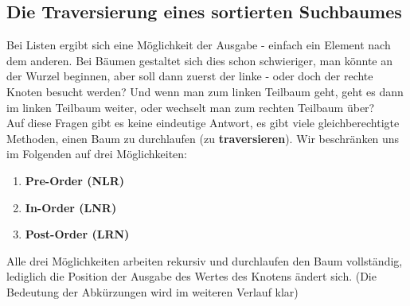 \documentclass{article}
\begin{document}
\subsection{Die Traversierung eines sortierten Suchbaumes}

Bei Listen ergibt sich eine  Möglichkeit der Ausgabe - einfach ein Element nach dem anderen. Bei Bäumen gestaltet sich dies schon schwieriger, man könnte an der Wurzel beginnen, aber soll dann zuerst der linke - oder doch der rechte Knoten besucht werden? Und wenn man zum linken Teilbaum geht, geht es dann im linken Teilbaum weiter, oder wechselt man zum rechten Teilbaum über? \\
Auf diese Fragen gibt es keine eindeutige Antwort, es gibt viele gleichberechtigte Methoden, einen Baum zu durchlaufen (zu \textbf{traversieren}). Wir beschränken uns im Folgenden auf drei Möglichkeiten:

\begin{enumerate}
    \item \textbf{Pre-Order (NLR)}
    \item \textbf{In-Order (LNR)}
    \item \textbf{Post-Order (LRN)}
\end{enumerate}
Alle drei Möglichkeiten arbeiten rekursiv und durchlaufen den Baum vollständig, lediglich die Position der Ausgabe des Wertes des Knotens ändert sich. (Die Bedeutung der Abkürzungen wird im weiteren Verlauf klar)
\end{document}
